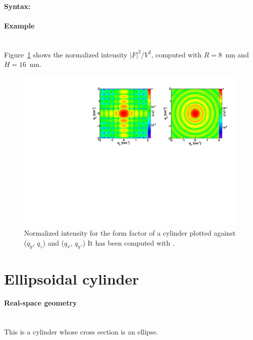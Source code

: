 \paragraph{Syntax:} 

\newpage

\paragraph{Example}\mbox{}\\
Figure~\ref{fig:FFcylinderEx} shows the normalized intensity
$|F|^2/V^2$, computed with $R=8$~nm and \mbox{$H=16$~nm.}
\begin{figure}[ht]
\begin{center}
\includegraphics[angle=-90,width=\textwidth]{Figures/ff/figffcylinder.pdf}
\end{center}
\caption{Normalized intensity for the form factor of a cylinder plotted against ($q_y$, $q_z$) and  ($q_x$, $q_y$.) It
has been  computed with .}
\label{fig:FFcylinderEx}
\end{figure}

\newpage
\section{Ellipsoidal cylinder}  

\paragraph{Real-space geometry}\mbox{}\\
This is a cylinder whose cross section is an ellipse.

